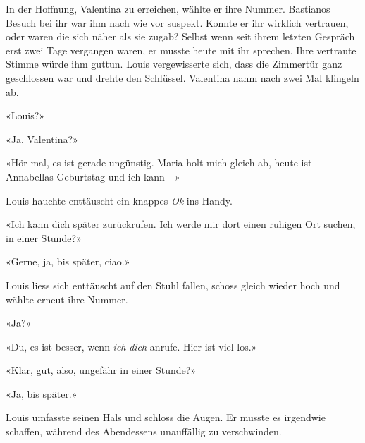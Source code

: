 In der Hoffnung, Valentina zu erreichen, wählte er ihre Nummer.
Bastianos Besuch bei ihr war ihm nach wie vor suspekt. Konnte er ihr
wirklich vertrauen, oder waren die sich näher als sie zugab? Selbst wenn
seit ihrem letzten Gespräch erst zwei Tage vergangen waren, er musste
heute mit ihr sprechen. Ihre vertraute Stimme würde ihm guttun.
Louis vergewisserte sich, dass die Zimmertür ganz geschlossen war und
drehte den Schlüssel.
Valentina nahm nach zwei Mal klingeln ab.

«Louis?»

«Ja, Valentina?»

«Hör mal, es ist gerade ungünstig. Maria holt mich gleich ab, heute ist
Annabellas Geburtstag und ich kann - »

Louis hauchte enttäuscht ein knappes \emph{Ok} ins Handy.

«Ich kann dich später zurückrufen. Ich werde mir dort einen ruhigen Ort
suchen, in einer Stunde?»

«Gerne, ja, bis später, ciao.»

Louis liess sich enttäuscht auf den Stuhl fallen, schoss gleich wieder
hoch und wählte erneut ihre Nummer.

«Ja?»

«Du, es ist besser, wenn \emph{ich} \emph{dich} anrufe. Hier ist viel
los.»

«Klar, gut, also, ungefähr in einer Stunde?»

«Ja, bis später.»

Louis umfasste seinen Hals und schloss die Augen. 
Er musste es irgendwie schaffen, während des Abendessens unauffällig zu
verschwinden.
